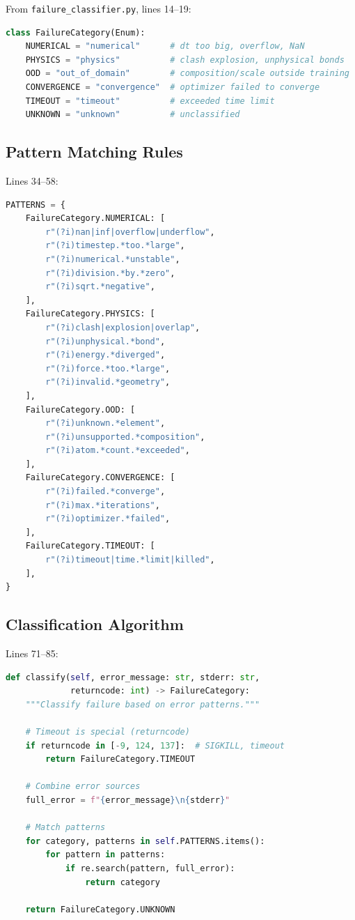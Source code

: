 \documentclass[11pt]{article}
\begin{document}
From \texttt{failure\_classifier.py}, lines 14--19:

\begin{lstlisting}[language=Python]
class FailureCategory(Enum):
    NUMERICAL = "numerical"      # dt too big, overflow, NaN
    PHYSICS = "physics"          # clash explosion, unphysical bonds
    OOD = "out_of_domain"        # composition/scale outside training
    CONVERGENCE = "convergence"  # optimizer failed to converge
    TIMEOUT = "timeout"          # exceeded time limit
    UNKNOWN = "unknown"          # unclassified
\end{lstlisting}

\subsection{Pattern Matching Rules}

Lines 34--58:

\begin{lstlisting}[language=Python]
PATTERNS = {
    FailureCategory.NUMERICAL: [
        r"(?i)nan|inf|overflow|underflow",
        r"(?i)timestep.*too.*large",
        r"(?i)numerical.*unstable",
        r"(?i)division.*by.*zero",
        r"(?i)sqrt.*negative",
    ],
    FailureCategory.PHYSICS: [
        r"(?i)clash|explosion|overlap",
        r"(?i)unphysical.*bond",
        r"(?i)energy.*diverged",
        r"(?i)force.*too.*large",
        r"(?i)invalid.*geometry",
    ],
    FailureCategory.OOD: [
        r"(?i)unknown.*element",
        r"(?i)unsupported.*composition",
        r"(?i)atom.*count.*exceeded",
    ],
    FailureCategory.CONVERGENCE: [
        r"(?i)failed.*converge",
        r"(?i)max.*iterations",
        r"(?i)optimizer.*failed",
    ],
    FailureCategory.TIMEOUT: [
        r"(?i)timeout|time.*limit|killed",
    ],
}
\end{lstlisting}

\subsection{Classification Algorithm}

Lines 71--85:

\begin{lstlisting}[language=Python]
def classify(self, error_message: str, stderr: str, 
             returncode: int) -> FailureCategory:
    """Classify failure based on error patterns."""
    
    # Timeout is special (returncode)
    if returncode in [-9, 124, 137]:  # SIGKILL, timeout
        return FailureCategory.TIMEOUT
    
    # Combine error sources
    full_error = f"{error_message}\n{stderr}"
    
    # Match patterns
    for category, patterns in self.PATTERNS.items():
        for pattern in patterns:
            if re.search(pattern, full_error):
                return category
    
    return FailureCategory.UNKNOWN
\end{lstlisting}
\end{document}
